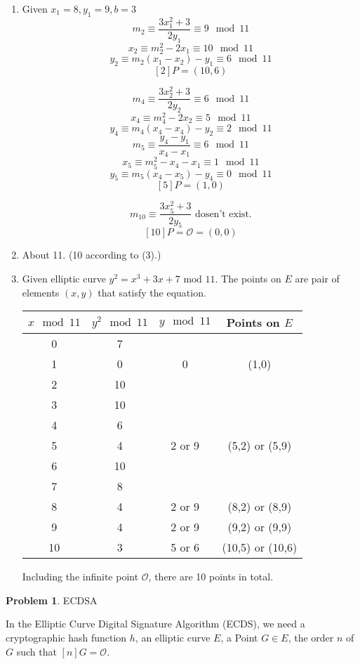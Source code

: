 \documentclass[12pt]{article}
\theoremstyle{definition}
\newtheorem{problem}{Problem}
\begin{document}
	\begin{enumerate}
		\item Given $x_1=8,y_1=9,b=3$
		$$m_2\equiv\frac{3x_1^2+3}{2y_1}\equiv9\mod11$$
		$$x_2\equiv m_2^2-2x_1\equiv10\mod11$$
		$$y_2\equiv m_2(x_1-x_2)-y_1\equiv6\mod11$$
		$$[2]P=(10,6)$$
		
		$$m_4\equiv\frac{3x_2^2+3}{2y_2}\equiv6\mod11$$
		$$x_4\equiv m_4^2-2x_2\equiv5\mod11$$
		$$y_4\equiv m_4(x_4-x_4)-y_2\equiv2\mod11$$
		$$m_5\equiv\frac{y_4-y_1}{x_4-x_1}\equiv6\mod11$$
		$$x_5\equiv m_5^2-x_4-x_1\equiv1\mod11$$
		$$y_5\equiv m_5(x_4-x_5)-y_4\equiv0\mod11$$
		$$[5]P=(1,0)$$
		
		$$m_{10}\equiv\frac{3x_5^2+3}{2y_5}\text{ dosen't exist.}$$
		$$[10]P=\mathcal{O}=(0,0)$$
		\item About 11. (10 according to (3).)
		\item Given elliptic curve $y^2=x^3+3x+7 \text{ mod }11$. The points on $E$ are pair of elements $(x,y)$ that satisfy the equation.
		\begin{center}
			\begin{tabular}{cccc}
				\hline
				$x\mod11$ & $y^2\mod11$ & $y\mod11$ & Points on $E$\\\hline
				0  & 7  & \\
				1  & 0  & 0 & (1,0)\\
				2  & 10 & \\
				3  & 10 & \\
				4  & 6  &  \\
				5  & 4  & 2 or 9 & (5,2) or (5,9) \\
				6  & 10 & \\
				7  & 8  & \\
				8  & 4  & 2 or 9 & (8,2) or (8,9) \\
				9  & 4  & 2 or 9 & (9,2) or (9,9) \\
				10 & 3  & 5 or 6 & (10,5) or (10,6) \\\hline
			\end{tabular}
		\end{center}
		Including the infinite point $\mathcal{O}$, there are 10 points in total.
	\end{enumerate}
	
	\begin{problem}
		ECDSA
	\end{problem}
	
	In the Elliptic Curve Digital Signature Algorithm (ECDS), we need a cryptographic hash function $h$, an elliptic curve $E$, a Point $G\in E$, the order $n$ of $G$ such that $[n]G=\mathcal{O}$.
	
\end{document}
